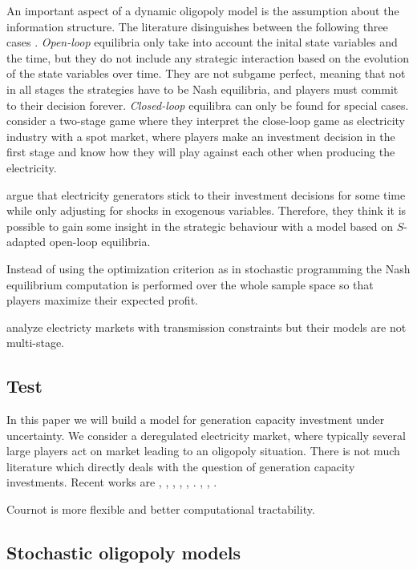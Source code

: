 An important aspect of a dynamic oligopoly model is the assumption about the information structure. The literature disinguishes between the following three cases \citep[see, e.g.,][]{Cellini2004}. \emph{Open-loop} equilibria only take into account the inital state variables and the time, but they do not include any strategic interaction based on the evolution of the state variables over time. They are not subgame perfect, meaning that not in all stages the strategies have to be Nash equilibria, and players must commit to their decision forever.  \emph{Closed-loop} equilibra can only be found for special cases. \cite{Murphy2005} consider a two-stage game where they interpret the close-loop game as electricity industry with a spot market, where players make an investment decision in the first stage and know how they will play against each other when producing the electricity.


\cite{Pineau2003} argue that electricity generators stick to their investment decisions for some time while only adjusting for shocks in exogenous variables. Therefore, they think it is possible to gain some insight in the strategic behaviour with a model based on $S$-adapted open-loop equilibria. 

Instead of using the optimization criterion as in stochastic programming the Nash equilibrium computation is performed over the whole sample space so that players maximize their expected profit.

\cite{Neuhoff2005} analyze electricty markets with transmission constraints but their models are not multi-stage.


\subsection{Test}
\label{sec:test}

In this paper we will build a model for generation capacity investment under uncertainty. We consider a deregulated electricity market, where typically several large players act on market leading to an oligopoly situation. There is not much literature which directly deals with the question of  generation capacity investments. Recent works are \cite{Chuang2001}, \cite{Ventosa2002}, \cite{Chaton2003}, \cite{Hogendorn2003}, \cite{Pineau2003}, \cite{Ehrenmann2004}. \cite{Murphy2005}, \cite{Kiesling2007}, \cite{Pineau2007}.


Cournot is more flexible and better computational tractability.


\subsection{Stochastic oligopoly models}

